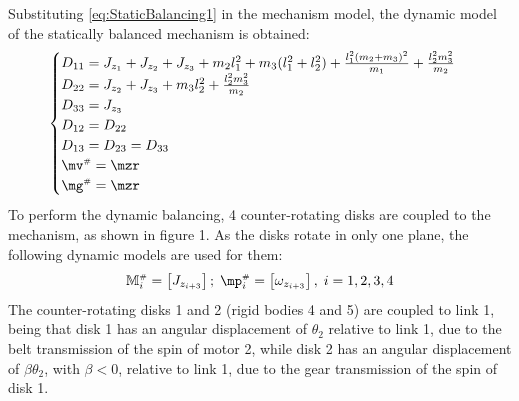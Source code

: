 \documentclass[a4paper,11pt,brazil,fleqn]{article}
\begin{document}
Substituting \eqref{eq:StaticBalancing1} in the mechanism model, the dynamic model of the statically balanced mechanism is obtained:
\begin{equation}\label{eq:StaticBalanced1}
\begin{cases}
D_{11} = J_{z_1} + J_{z_2} + J_{z_3} + m_2 l_1^2 + m_3 (l_1^2 + l_2^2) + \frac{l_1^2 (m_2 + m_3)^2}{m_1} + \frac{l_2^2 m_3^2}{m_2} \\
D_{22} = J_{z_2} + J_{z_3} + m_3 l_2^2 + \frac{l_2^2 m_3^2}{m_2} \\
D_{33} = J_{z_3} \\
D_{12} = D_{22} \\
D_{13} = D_{23} = D_{33} \\
\mv\ssh = \mzr \\
\mg\ssh = \mzr
\end{cases}
\end{equation}
To perform the dynamic balancing, 4 counter-rotating disks are coupled to the mechanism, as shown in figure 1. As the disks rotate in only one plane, the following dynamic models are used for them:
\begin{equation}\label{eq:DiscsModel1}
\mM\ssh_i = \begin{bmatrix} J_{z_{i+3}} \end{bmatrix}; \; \mp\ssh_i = \begin{bmatrix} \omega_{z_{i+3}} \end{bmatrix}, \; i = 1, 2, 3, 4
\end{equation}
The counter-rotating disks 1 and 2 (rigid bodies 4 and 5) are coupled to link 1, being that disk 1 has an angular displacement of $\theta_2$ relative to link 1, due to the belt transmission of the spin of motor 2, while disk 2 has an angular displacement of $\beta\theta_2$, with $\beta < 0$, relative to link 1, due to the gear transmission of the spin of disk 1.
\end{document}
